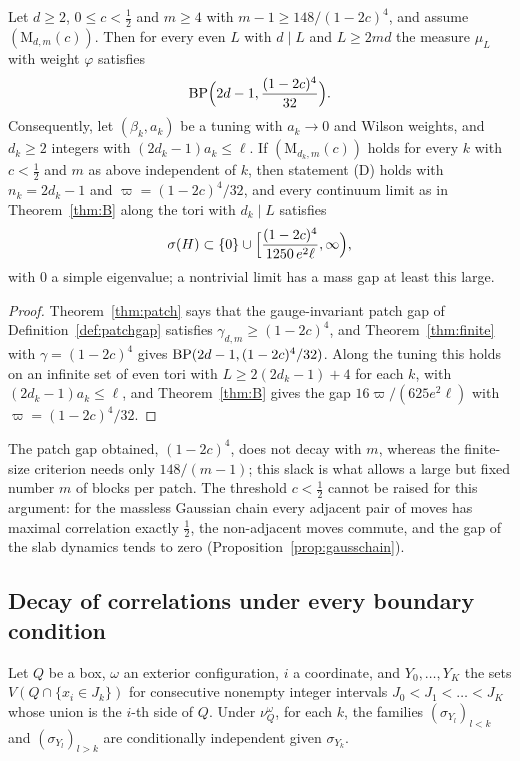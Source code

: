 \begin{mainthm}\label{thm:D}
Let $d\ge2$, $0\le c<\frac12$ and $m\ge4$ with $m-1\ge148/(1-2c)^4$, and
assume $(\mathrm M_{d,m}(c))$. Then for every even $L$ with $d\mid L$ and
$L\ge2md$ the measure $\mu_L$ with weight $\varphi$ satisfies
\[
\mathrm{BP}\Bigl(2d-1,\frac{(1-2c)^4}{32}\Bigr).
\]
Consequently, let $(\beta_k,a_k)$ be a tuning with $a_k\to0$ and Wilson
weights, and $d_k\ge2$ integers with $(2d_k-1)a_k\le\ell$. If
$(\mathrm M_{d_k,m}(c))$ holds for every $k$ with $c<\frac12$ and $m$ as
above independent of $k$, then statement (D) holds with $n_k=2d_k-1$ and
$\varpi=(1-2c)^4/32$, and every continuum limit as in Theorem~\ref{thm:B}
along the tori with $d_k\mid L$ satisfies
\[
\sigma(H)\subset\{0\}\cup\Bigl[\frac{(1-2c)^4}{1250\,e^2\ell},\infty\Bigr),
\]
with $0$ a simple eigenvalue; a nontrivial limit has a mass gap at least
this large.
\end{mainthm}

\begin{proof}
Theorem~\ref{thm:patch} says that the gauge-invariant patch gap of
Definition~\ref{def:patchgap} satisfies $\gamma_{d,m}\ge(1-2c)^4$, and
Theorem~\ref{thm:finite} with $\gamma=(1-2c)^4$ gives
$\mathrm{BP}(2d-1,(1-2c)^4/32)$. Along the tuning this holds on an infinite set of
even tori with $L\ge2(2d_k-1)+4$ for each $k$, with $(2d_k-1)a_k\le\ell$, and
Theorem~\ref{thm:B} gives the gap $16\varpi/(625e^2\ell)$ with
$\varpi=(1-2c)^4/32$.
\end{proof}

The patch gap obtained, $(1-2c)^4$, does not decay with $m$, whereas the
finite-size criterion needs only $148/(m-1)$; this slack is what allows a
large but fixed number $m$ of blocks per patch. The threshold $c<\frac12$
cannot be raised for this argument: for the massless Gaussian chain every
adjacent pair of moves has maximal correlation exactly $\frac12$, the
non-adjacent moves commute, and the gap of the slab dynamics tends to zero
(Proposition~\ref{prop:gausschain}).

\subsection{Decay of correlations under every boundary condition}

\begin{lemma}\label{lem:boxmarkov}
Let $Q$ be a box, $\omega$ an exterior configuration, $i$ a coordinate, and
$Y_0,\dots,Y_K$ the sets $V(Q\cap\{x_i\in J_k\})$ for consecutive nonempty
integer intervals $J_0<J_1<\dots<J_K$ whose union is the $i$-th side of $Q$.
Under $\nu^\omega_Q$, for each $k$, the families $(\sigma_{Y_l})_{l<k}$ and
$(\sigma_{Y_l})_{l>k}$ are conditionally independent given $\sigma_{Y_k}$.
\end{lemma}

